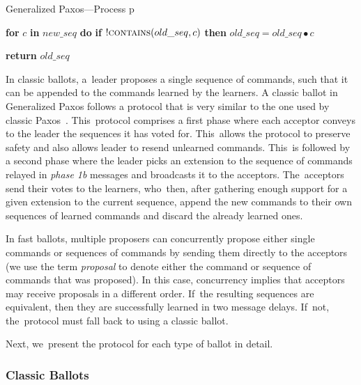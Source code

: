 \documentclass[algorithms,article,accept,moreauthors,pdftex,10pt,a4paper]{Definitions/mdpi}
\begin{document}
\begin{algorithm}[H]
\caption{Generalized Paxos---Process p}
\begin{algorithmic}[1]
\State \textbf{for} $c$ \textbf{in} $new\_seq$ \textbf{do} 
\State \hspace{\algorithmicindent} \textbf{if} $!\Call{contains}{old\_seq,c}$ \textbf{then}
\State \hspace{\algorithmicindent}\hspace{\algorithmicindent}\hspace{\algorithmicindent} $old\_seq = old\_seq \bullet c$

\State \textbf{return} $old\_seq$
\EndFunction
\end{algorithmic}
\end{algorithm}
In classic ballots, a~leader proposes a single sequence of commands, such that it can be appended to the commands learned by the learners. 
A classic ballot in Generalized Paxos follows a protocol that is very similar to the one used by classic Paxos~\cite{Lamport:1998}. This~protocol comprises a first phase where each acceptor conveys to the leader the sequences it has voted for. This~allows the protocol to preserve safety and also allows leader to resend unlearned commands. This~is followed by a second phase where the leader picks an extension to the sequence of commands relayed in \textit{phase 1b} messages and broadcasts it to the acceptors. The~acceptors send their votes to the learners, who~then, after gathering enough support for a given extension to the current sequence, append the new commands to their own sequences of learned commands and discard the already learned ones.\par

In fast ballots, multiple proposers can concurrently propose either single commands or sequences of commands by sending them directly to the acceptors (we use the term \textit{proposal} to denote either the command or sequence of commands that was proposed).
In this case, concurrency implies that acceptors may receive proposals in a different order. If~the resulting sequences are equivalent, then they are successfully learned in two message delays. If~not, the~protocol must fall back to using a classic ballot.

Next, we~present the protocol for each type of ballot in detail.

\subsubsection{Classic Ballots} 
\end{document}

